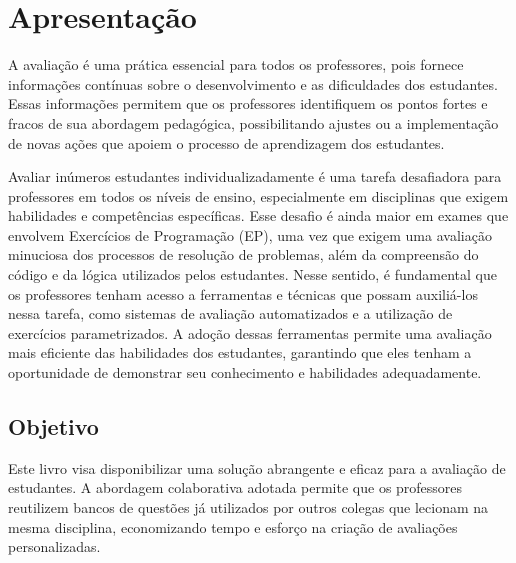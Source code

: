 
\label{ch:introducao}

\section{Apresentação}



A avaliação é uma prática essencial para todos os professores, pois fornece informações contínuas sobre o desenvolvimento e as dificuldades dos estudantes. Essas informações permitem que os professores identifiquem os pontos fortes e fracos de sua abordagem pedagógica, possibilitando ajustes ou a implementação de novas ações que apoiem o processo de aprendizagem dos estudantes.

Avaliar inúmeros estudantes individualizadamente é uma tarefa desafiadora para professores em todos os níveis de ensino, especialmente em disciplinas que exigem habilidades e competências específicas. Esse desafio é ainda maior em exames que envolvem Exercícios de Programação (EP), uma vez que exigem uma avaliação minuciosa dos processos de resolução de problemas, além da compreensão do código e da lógica utilizados pelos estudantes. Nesse sentido, é fundamental que os professores tenham acesso a ferramentas e técnicas que possam auxiliá-los nessa tarefa, como sistemas de avaliação automatizados e a utilização de exercícios parametrizados. A adoção dessas ferramentas permite uma avaliação mais eficiente das habilidades dos estudantes, garantindo que eles tenham a oportunidade de demonstrar seu conhecimento e habilidades adequadamente.

\subsection{Objetivo} 
Este livro visa disponibilizar uma solução abrangente e eficaz para a avaliação de estudantes. A abordagem colaborativa adotada permite que os professores reutilizem bancos de questões já utilizados por outros colegas que lecionam na mesma disciplina, economizando tempo e esforço na criação de avaliações personalizadas.

